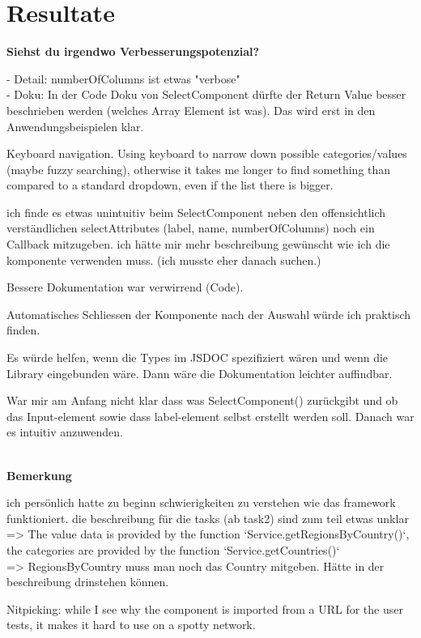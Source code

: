 \section*{Resultate}
\noindent
\textbf{Siehst du irgendwo Verbesserungspotenzial?}

\noindent 
- Detail: numberOfColumns ist etwas "verbose" 
\\
- Doku: In der Code Doku von SelectComponent dürfte der Return Value besser beschrieben werden (welches Array Element ist was). 
Das wird erst in den Anwendungsbeispielen klar. 

Keyboard navigation. 
Using keyboard to narrow down possible categories/values (maybe fuzzy searching), 
otherwise it takes me longer to find something than compared to a standard dropdown, even if the list there is bigger. 

ich finde es etwas unintuitiv beim SelectComponent neben den offensichtlich verständlichen selectAttributes (label, name, numberOfColumns) noch ein Callback mitzugeben. 
ich hätte mir mehr beschreibung gewünscht wie ich die komponente verwenden muss. 
(ich musste eher danach suchen.)

Bessere Dokumentation war verwirrend (Code). 

Automatisches Schliessen der Komponente nach der Auswahl würde ich praktisch finden. 

Es würde helfen, wenn die Types im JSDOC spezifiziert wären und wenn die Library eingebunden wäre. 
Dann wäre die Dokumentation leichter auffindbar. 

War mir am Anfang nicht klar dass was SelectComponent() zurückgibt und ob das Input-element sowie dass label-element selbst erstellt werden soll. 
Danach war es intuitiv anzuwenden. 

 \\

\noindent
\textbf{Bemerkung}

ich persönlich hatte zu beginn schwierigkeiten zu verstehen wie das framework funktioniert. 
die beschreibung für die tasks (ab task2) sind zum teil etwas unklar 
\\
=> The value data is provided by the function `Service.getRegionsByCountry()`, 
the categories are provided by the function `Service.getCountries()` 
\\
=> RegionsByCountry muss man noch das Country mitgeben. 
Hätte in der beschreibung drinstehen können. 

Nitpicking: while I see why the component is imported from a URL for the user tests, it makes it hard to use on a spotty network. 

